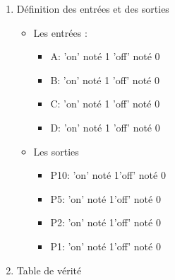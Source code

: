 \begin{enumerate}
\item Définition des entrées et des sorties 

\begin{itemize}
\item Les entrées :

\begin{itemize}
\item A: \qquad 'on' noté 1 \qquad 'off' noté 0
 

\item B: \qquad 'on' noté 1 \qquad 'off' noté 0
 

\item C: \qquad 'on' noté 1 \qquad 'off' noté 0
 

\item D: \qquad 'on' noté 1 \qquad 'off' noté 0
 

\end{itemize}
\item Les sorties 

\begin{itemize}
\item P10: \qquad 'on' noté 1\qquad 'off' noté  0


\item P5: \qquad 'on' noté 1\qquad 'off' noté  0


\item P2: \qquad 'on' noté 1\qquad 'off' noté  0


\item P1: \qquad 'on' noté 1\qquad 'off' noté  0


\end{itemize}
\end{itemize}
\item Table de vérité 


        \begin{tabular}{|c|c|c|c|c||c|c|c|c|}

    \toprule


\end{tabular}
\end{enumerate}
